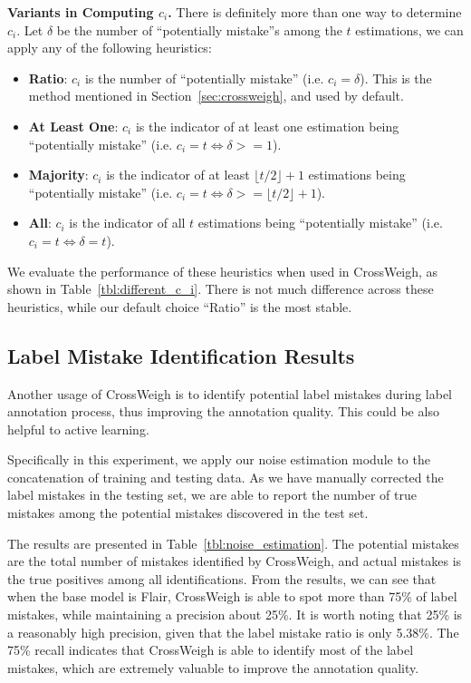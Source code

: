\documentclass[11pt,a4paper]{article}
\newcommand{\our}{\mbox{\sf CrossWeigh}\xspace}
\newcommand{\smallsection}[1]{{\noindent\textbf{#1.}}}
\begin{document}
        \smallsection{Variants in Computing $c_i$}
        There is definitely more than one way to determine $c_i$. Let $\delta$ be the number of ``potentially mistake''s among the $t$ estimations, we can apply any of the following heuristics:
        \begin{itemize}[leftmargin=*,nosep]
            \item \textbf{Ratio}: $c_i$ is the number of  ``potentially mistake'' (i.e. $c_i = \delta$). This is the method mentioned in Section~\ref{sec:crossweigh}, and used by default.
            \item \textbf{At Least One}: $c_i$ is the indicator of at least one estimation being ``potentially mistake'' (i.e. $c_i = t \iff \delta >= 1$).
            \item \textbf{Majority}: $c_i$ is the indicator of at least $\lfloor t/2 \rfloor + 1$ estimations being ``potentially mistake''
            (i.e. $c_i = t \iff \delta >= \lfloor t/2 \rfloor + 1$).
            \item \textbf{All}: $c_i$ is the indicator of all $t$ estimations being ``potentially mistake'' (i.e. $c_i = t \iff \delta = t$).
        \end{itemize}
        We evaluate the performance of these heuristics when used in \our, as shown in Table~\ref{tbl:different_c_i}.
        There is not much difference across these heuristics, while our default choice ``Ratio'' is the most stable.


    \subsection{Label Mistake Identification Results}

        Another usage of \our is to identify potential label mistakes during label annotation process, thus improving the annotation quality.
        This could be also helpful to active learning.
        
        Specifically in this experiment, we apply our noise estimation module to the concatenation of training and testing data. 
        As we have manually corrected the label mistakes in the testing set, we are able to report the number of true mistakes among the potential mistakes discovered in the test set.
        
        The results are presented in  Table~\ref{tbl:noise_estimation}. 
        The potential mistakes are the total number of mistakes identified by \our, and actual mistakes is the true positives among all identifications.
        From the results, we can see that when the base model is Flair, \our is able to spot more than 75\% of label mistakes, 
        while maintaining a precision about 25\%.
        It is worth noting that 25\% is a reasonably high precision, given that the label mistake ratio is only 5.38\%.
        The 75\% recall indicates that \our is able to identify most of the label mistakes, which are extremely valuable to improve the annotation quality. 
        
\end{document}
